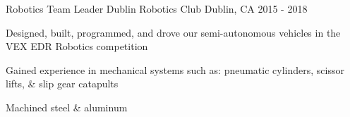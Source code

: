 \begin{cventries}



\cventry
{Robotics Team Leader} %
{Dublin Robotics Club} %
{Dublin, CA} %
{2015 - 2018} %
{ %
\begin{cvitems}
\item {Designed, built, programmed, and drove our semi-autonomous vehicles in the VEX EDR Robotics competition}
\item {Gained experience in mechanical systems such as: pneumatic cylinders, scissor lifts, \& slip gear catapults}
\item {Machined steel \& aluminum}
\end{cvitems}
}













\end{cventries}